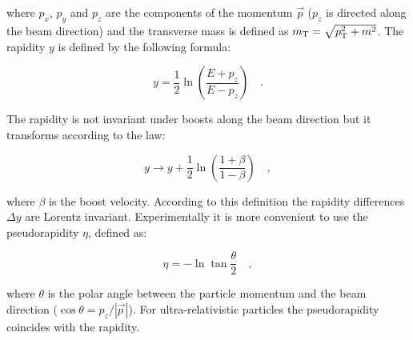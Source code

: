 where $p_x$, $p_y$ and $p_z$ are the components of the momentum $\vec{p}$ ($p_z$ is directed along the beam direction) and the transverse mass is defined as $m_\mathrm{T} = \sqrt{p_\mathrm{T}^2 + m^2}$. The rapidity $y$ is defined by the following formula:

\begin{equation}
y = \frac{1}{2} \ln \left(  \frac{E+p_z}{E-p_z} \right) \quad .
\end{equation}

The rapidity is not invariant under boosts along the beam direction but it transforms according to the law:

\begin{equation}
y \longrightarrow y + \frac{1}{2} \ln \left(  \frac{1+\beta}{1-\beta} \right) \quad ,
\end{equation}

where $\beta$ is the boost velocity. According to this definition the rapidity differences $\Delta y$ are Lorentz invariant. Experimentally it is more convenient to use the pseudorapidity $\eta$, defined as:

\begin{equation}
\eta = - \ln \tan \frac{\theta}{2} \quad ,
\end{equation}

where $\theta$ is the polar angle between the particle momentum and the beam direction ($\cos \theta = p_z/|\vec{p\,}|$). For ultra-relativistic particles the pseudorapidity coincides with the rapidity.








